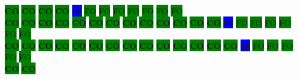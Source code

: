 \colorbox{green}{\color[rgb]{0,0,0}\textbf{CO}}%
\colorbox{green}{\color[rgb]{0,0,0}\textbf{CO}}%
\colorbox{green}{\color[rgb]{0,0,0}\textbf{CO}}%
\colorbox{green}{\color[rgb]{0,0,0}\textbf{CO}}%
\colorbox{blue}{\color[rgb]{1,0,0}\textbf{06}}%
\colorbox{green}{\color[gray]{0.75}FO}%
\colorbox{green}{\color[gray]{0.75}FO}%
\colorbox{green}{\color[gray]{0.75}FO}%
\colorbox{green}{\color[gray]{0.75}FO}%
\colorbox{green}{\color[gray]{0.75}FO}%
\colorbox{green}{\color[gray]{0.75}FO}%
\colorbox{green}{\color[gray]{0.75}FO}%
\\
\colorbox{green}{\color[rgb]{0,0,0}\textbf{CO}}%
\colorbox{green}{\color[rgb]{0,0,0}\textbf{CO}}%
\colorbox{green}{\color[rgb]{0,0,0}\textbf{CO}}%
\colorbox{green}{\color[rgb]{0,0,0}\textbf{CO}}%
\colorbox{green}{\color[rgb]{0,0,0}\textbf{CO}}%
\colorbox{green}{\color[rgb]{0,0,0}\textbf{CO}}%
\colorbox{green}{\color[rgb]{0,0,0}\textbf{CO}}%
\colorbox{green}{\color[rgb]{0,0,0}\textbf{CO}}%
\colorbox{green}{\color[rgb]{0,0,0}\textbf{CO}}%
\colorbox{green}{\color[rgb]{0,0,0}\textbf{CO}}%
\colorbox{green}{\color[rgb]{0,0,0}\textbf{CO}}%
\colorbox{green}{\color[rgb]{0,0,0}\textbf{CO}}%
\colorbox{green}{\color[rgb]{0,0,0}\textbf{CO}}%
\colorbox{blue}{\color[rgb]{1,0,0}\textbf{08}}%
\colorbox{green}{\color[gray]{0.75}FO}%
\colorbox{green}{\color[gray]{0.75}FO}%
\colorbox{green}{\color[gray]{0.75}FO}%
\colorbox{green}{\color[gray]{0.75}FO}%
\colorbox{green}{\color[gray]{0.75}FO}%
\colorbox{green}{\color[gray]{0.75}FO}%
\\
\colorbox{green}{\color[rgb]{0,0,0}\textbf{CO}}%
\colorbox{green}{\color[rgb]{0,0,0}\textbf{CO}}%
\colorbox{green}{\color[rgb]{0,0,0}\textbf{CO}}%
\colorbox{green}{\color[rgb]{0,0,0}\textbf{CO}}%
\colorbox{green}{\color[rgb]{0,0,0}\textbf{CO}}%
\colorbox{green}{\color[rgb]{0,0,0}\textbf{CO}}%
\colorbox{green}{\color[rgb]{0,0,0}\textbf{CO}}%
\colorbox{green}{\color[rgb]{0,0,0}\textbf{CO}}%
\colorbox{green}{\color[rgb]{0,0,0}\textbf{CO}}%
\colorbox{green}{\color[rgb]{0,0,0}\textbf{CO}}%
\colorbox{green}{\color[rgb]{0,0,0}\textbf{CO}}%
\colorbox{green}{\color[rgb]{0,0,0}\textbf{CO}}%
\colorbox{green}{\color[rgb]{0,0,0}\textbf{CO}}%
\colorbox{green}{\color[rgb]{0,0,0}\textbf{CO}}%
\colorbox{blue}{\color[rgb]{1,0,0}\textbf{10}}%
\colorbox{green}{\color[gray]{0.75}FO}%
\colorbox{green}{\color[gray]{0.75}FO}%
\colorbox{green}{\color[gray]{0.75}FO}%
\colorbox{green}{\color[gray]{0.75}FO}%
\colorbox{green}{\color[gray]{0.75}FO}%
\\
\colorbox{green}{\color[rgb]{0,0,0}\textbf{CO}}%
\colorbox{green}{\color[rgb]{0,0,0}\textbf{CO}}%
